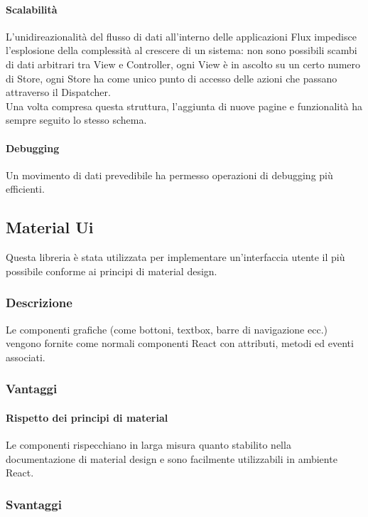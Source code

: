 \paragraph{Scalabilità}
L'unidireazionalità del flusso di dati all'interno delle applicazioni Flux impedisce
l'esplosione della complessità al crescere di un sistema: non sono possibili scambi di
dati arbitrari tra View e Controller, ogni View è in ascolto su un certo numero di Store,
ogni Store ha come unico punto di accesso delle azioni che passano attraverso il Dispatcher. \\

Una volta compresa questa struttura, l'aggiunta di nuove pagine e funzionalità
ha sempre seguito lo stesso schema.

\paragraph{Debugging}
Un movimento di dati prevedibile ha permesso operazioni di debugging più efficienti.

\subsection{Material Ui}\label{material-ui}

Questa libreria è stata utilizzata per implementare un'interfaccia utente il più
possibile conforme ai principi di material design.

\subsubsection{Descrizione}
Le componenti grafiche (come bottoni, textbox, barre di navigazione ecc.) vengono
fornite come normali componenti React con attributi, metodi ed eventi associati.

\subsubsection{Vantaggi}

\paragraph{Rispetto dei principi di material}
Le componenti rispecchiano in larga
misura quanto stabilito nella documentazione di material design e sono facilmente 
utilizzabili in ambiente React.

\subsubsection{Svantaggi}\label{svantaggi-material-ui}

